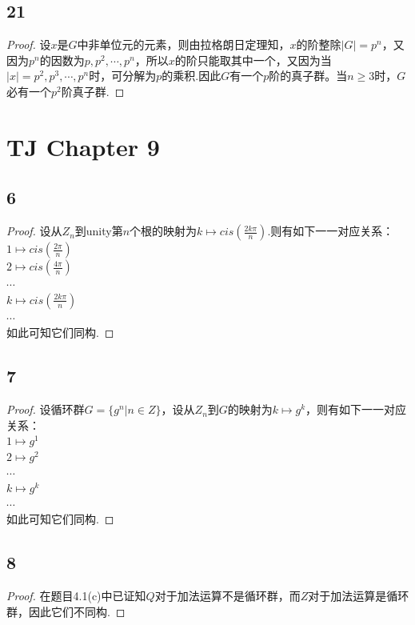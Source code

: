 \documentclass[twocolumn]{article}
\newenvironment{SChinese}{
	\CJKfamily{gbsn}
	\CJKtilde
	\CJKnospace}{}
\begin{document}
\begin{CJK}{UTF8}{}
\begin{SChinese}
				\subsection*{21}
					\begin{proof}
						设$x$是$G$中非单位元的元素，则由拉格朗日定理知，$x$的阶整除$|G|=p^n$，又因为$p^n$的因数为$p,p^2,\cdots,p^n$，所以$x$的阶只能取其中一个，又因为当$|x|=p^2,p^3,\cdots,p^n$时，可分解为$p$的乘积.因此$G$有一个$p$阶的真子群。当$n\ge3$时，$G$必有一个$p^2$阶真子群.
					\end{proof}
			\section*{TJ Chapter 9}
				\subsection*{6}
					\begin{proof}
						设从$Z_n$到unity第$n$个根的映射为$k\mapsto cis(\frac{2k\pi}{n})$.则有如下一一对应关系：\\
						$1\mapsto cis(\frac{2\pi}{n})$\\
						$2\mapsto cis(\frac{4\pi}{n})$\\
						$\cdots$\\
						$k\mapsto cis(\frac{2k\pi}{n})$\\
						$\cdots$\\
						如此可知它们同构.
					\end{proof}
				\subsection*{7}
					\begin{proof}
						设循环群$G=\{g^n|n\in Z\}$，设从$Z_n$到$G$的映射为$k\mapsto g^k$，则有如下一一对应关系：\\
						$1\mapsto g^1$\\
						$2\mapsto g^2$\\
						$\cdots$\\
						$k\mapsto g^k$\\
						$\cdots$\\
						如此可知它们同构.
					\end{proof}
				\subsection*{8}
					\begin{proof}
						在题目4.1(c)中已证知$Q$对于加法运算不是循环群，而$Z$对于加法运算是循环群，因此它们不同构.
					\end{proof}

\end{SChinese}
\end{CJK}
\end{document}
